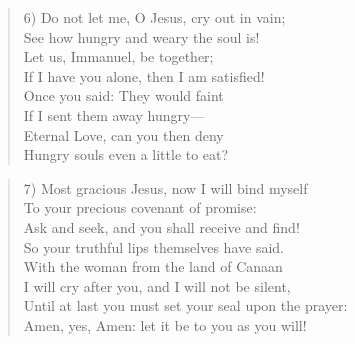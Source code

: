 \begin{verse}
6) Do not let me, O Jesus, cry out in vain;\\
See how hungry and weary the soul is!\\
Let us, Immanuel, be together;\\
If I have you alone, then I am satisfied!\\
Once you said: They would faint\\
If I sent them away hungry—\\
Eternal Love, can you then deny\\
Hungry souls even a little to eat?\\
\end{verse}

\begin{verse}
7) Most gracious Jesus, now I will bind myself\\
To your precious covenant of promise:\\
Ask and seek, and you shall receive and find!\\
So your truthful lips themselves have said.\\
With the woman from the land of Canaan\\
I will cry after you, and I will not be silent,\\
Until at last you must set your seal upon the prayer:\\
Amen, yes, Amen: let it be to you as you will!\\
\end{verse}
